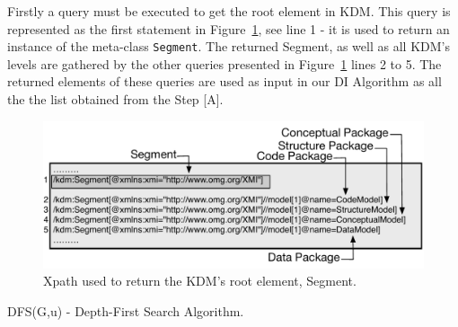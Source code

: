 
Firstly a query must be executed to get the root element in KDM. This query is represented as the first statement in Figure~\ref{fig:queriesXPath}, see line 1 - it is used to return an instance of the meta-class \texttt{Segment}. The returned Segment, as well as all KDM's levels are gathered by the other queries presented in Figure~\ref{fig:queriesXPath} lines 2 to 5. The returned elements of these queries are used as input in our DI Algorithm as all the the list obtained from the Step [A].

\begin{figure}[h]
	\centering
	\includegraphics[scale=0.479]{figuras/queiresANDATLSBESNew}
	\caption{Xpath used to return the KDM's root element, Segment.}
	\label{fig:queriesXPath}
\end{figure}


\begin{algorithm}[h]
     \SetAlgoLined
     \caption{DFS(G,u) - Depth-First Search Algorithm.}
     \label{alg:death1}
   \end{algorithm}

